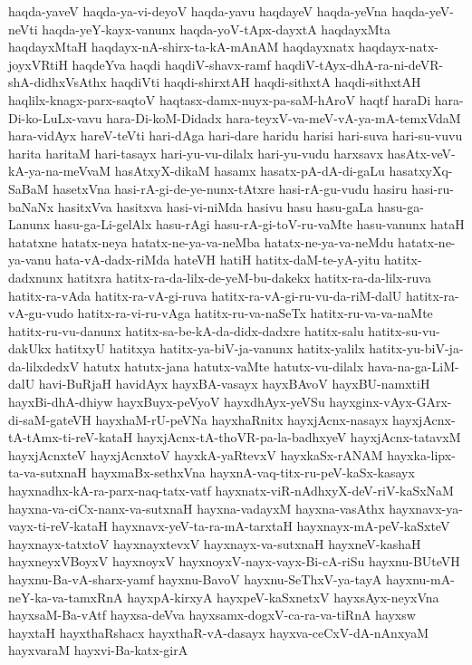 {haqda-yaveV
haqda-ya-vi-deyoV
haqda-yavu
haqdayeV
haqda-yeVna
haqda-yeV-neVti
haqda-yeY-kayx-vanunx
haqda-yoV-tApx-dayxtA
haqdayxMta
haqdayxMtaH
haqdayx-nA-shirx-ta-kA-mAnAM
haqdayxnatx
haqdayx-natx-joyxVRtiH
haqdeYva
haqdi
haqdiV-shavx-ramf
haqdiV-tAyx-dhA-ra-ni-deVR-shA-didhxVsAthx
haqdiVti
haqdi-shirxtAH
haqdi-sithxtA
haqdi-sithxtAH
haqlilx-knagx-parx-saqtoV
haqtasx-damx-nuyx-pa-saM-hAroV
haqtf
haraDi
hara-Di-ko-LuLx-vavu
hara-Di-koM-Didadx
hara-teyxV-va-meV-vA-ya-mA-temxVdaM
hara-vidAyx
hareV-teVti
hari-dAga
hari-dare
haridu
harisi
hari-suva
hari-su-vuvu
harita
haritaM
hari-tasayx
hari-yu-vu-dilalx
hari-yu-vudu
harxsavx
hasAtx-veV-kA-ya-na-meVvaM
hasAtxyX-dikaM
hasamx
hasatx-pA-dA-di-gaLu
hasatxyXq-SaBaM
hasetxVna
hasi-rA-gi-de-ye-nunx-tAtxre
hasi-rA-gu-vudu
hasiru
hasi-ru-baNaNx
hasitxVva
hasitxva
hasi-vi-niMda
hasivu
hasu
hasu-gaLa
hasu-ga-Lanunx
hasu-ga-Li-gelAlx
hasu-rAgi
hasu-rA-gi-toV-ru-vaMte
hasu-vanunx
hataH
hatatxne
hatatx-neya
hatatx-ne-ya-va-neMba
hatatx-ne-ya-va-neMdu
hatatx-ne-ya-vanu
hata-vA-dadx-riMda
hateVH
hatiH
hatitx-daM-te-yA-yitu
hatitx-dadxnunx
hatitxra
hatitx-ra-da-lilx-de-yeM-bu-dakekx
hatitx-ra-da-lilx-ruva
hatitx-ra-vAda
hatitx-ra-vA-gi-ruva
hatitx-ra-vA-gi-ru-vu-da-riM-dalU
hatitx-ra-vA-gu-vudo
hatitx-ra-vi-ru-vAga
hatitx-ru-va-naSeTx
hatitx-ru-va-va-naMte
hatitx-ru-vu-danunx
hatitx-sa-be-kA-da-didx-dadxre
hatitx-salu
hatitx-su-vu-dakUkx
hatitxyU
hatitxya
hatitx-ya-biV-ja-vanunx
hatitx-yalilx
hatitx-yu-biV-ja-da-lilxdedxV
hatutx
hatutx-jana
hatutx-vaMte
hatutx-vu-dilalx
hava-na-ga-LiM-dalU
havi-BuRjaH
havidAyx
hayxBA-vasayx
hayxBAvoV
hayxBU-namxtiH
hayxBi-dhA-dhiyw
hayxBuyx-peVyoV
hayxdhAyx-yeVSu
hayxginx-vAyx-GArx-di-saM-gateVH
hayxhaM-rU-peVNa
hayxhaRnitx
hayxjAcnx-nasayx
hayxjAcnx-tA-tAmx-ti-reV-kataH
hayxjAcnx-tA-thoVR-pa-la-badhxyeV
hayxjAcnx-tatavxM
hayxjAcnxteV
hayxjAcnxtoV
hayxkA-yaRtevxV
hayxkaSx-rANAM
hayxka-lipx-ta-va-sutxnaH
hayxmaBx-sethxVna
hayxnA-vaq-titx-ru-peV-kaSx-kasayx
hayxnadhx-kA-ra-parx-naq-tatx-vatf
hayxnatx-viR-nAdhxyX-deV-riV-kaSxNaM
hayxna-va-ciCx-nanx-va-sutxnaH
hayxna-vadayxM
hayxna-vasAthx
hayxnavx-ya-vayx-ti-reV-kataH
hayxnavx-yeV-ta-ra-mA-tarxtaH
hayxnayx-mA-peV-kaSxteV
hayxnayx-tatxtoV
hayxnayxtevxV
hayxnayx-va-sutxnaH
hayxneV-kashaH
hayxneyxVBoyxV
hayxnoyxV
hayxnoyxV-nayx-vayx-Bi-cA-riSu
hayxnu-BUteVH
hayxnu-Ba-vA-sharx-yamf
hayxnu-BavoV
hayxnu-SeThxV-ya-tayA
hayxnu-mA-neY-ka-va-tamxRnA
hayxpA-kirxyA
hayxpeV-kaSxnetxV
hayxsAyx-neyxVna
hayxsaM-Ba-vAtf
hayxsa-deVva
hayxsamx-dogxV-ca-ra-va-tiRnA
hayxsw
hayxtaH
hayxthaRshacx
hayxthaR-vA-dasayx
hayxva-ceCxV-dA-nAnxyaM
hayxvaraM
hayxvi-Ba-katx-girA
}
